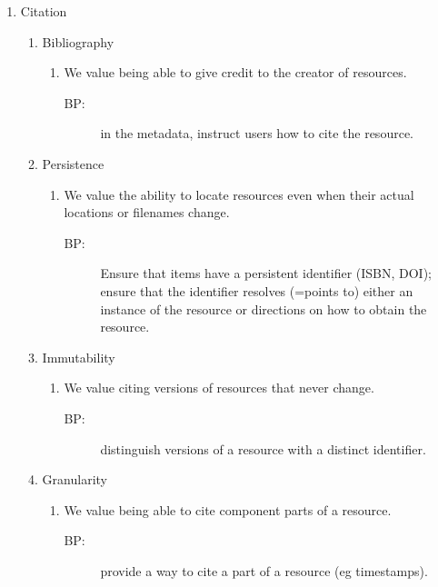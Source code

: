 \documentclass{article}
\begin{document}
\begin{enumerate}
\begin{enumerate}
\begin{enumerate}
    \end{enumerate}
  \end{enumerate}
  \item Citation
  \begin{enumerate}
     \item Bibliography
     \begin{enumerate}
       \item We value being able to give credit to the creator of resources.
       \begin{description}
         \item[BP:]  in the metadata, instruct users how to cite the resource.
      \end{description}
    \end{enumerate}
    \item Persistence
    \begin{enumerate}
      \item We value the ability to locate resources even when their actual locations or filenames change.
      \begin{description}
        \item[BP:]  Ensure that items have a persistent identifier (ISBN, DOI); ensure that the identifier resolves (=points to) either an instance of the resource or directions on how to obtain the resource.
      \end{description}
    \end{enumerate}
    \item Immutability
    \begin{enumerate}
      \item We value citing versions of resources that never change.
      \begin{description}
        \item[BP:]  distinguish versions of a resource with a distinct identifier.
      \end{description}
    \end{enumerate}
    \item Granularity
    \begin{enumerate}
      \item We value being able to cite component parts of a resource.
      \begin{description}
\item[BP:]  provide a way to cite a part of a resource (eg timestamps).
      \end{description}
    \end{enumerate}
  \end{enumerate}

\end{enumerate}
\end{document}
